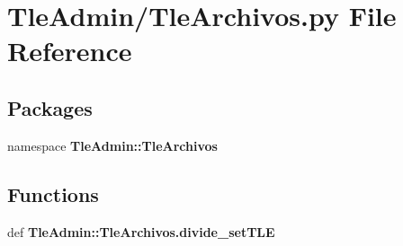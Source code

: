\section{\-Tle\-Admin/\-Tle\-Archivos.py \-File \-Reference}
\label{_tle_archivos_8py}
\subsection*{\-Packages}
\begin{DoxyCompactItemize}
\item 
namespace {\bf \-Tle\-Admin\-::\-Tle\-Archivos}
\end{DoxyCompactItemize}
\subsection*{\-Functions}
\begin{DoxyCompactItemize}
\item 
def {\bf \-Tle\-Admin\-::\-Tle\-Archivos.\-divide\-\_\-set\-T\-L\-E}
\end{DoxyCompactItemize}
